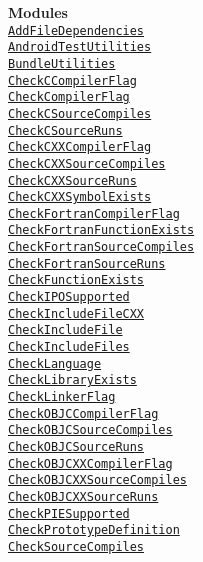 \documentclass{article}
\newcommand{\cmakemodule}[1]{{\href{https://cmake.org/cmake/help/v3.20/module/#1.html}{{\lstinline{#1}}}}}
\begin{document}
\pagebreak

\begin{minipage}[t]{0.18\linewidth}
\textbf{Modules}\\
\cmakemodule{AddFileDependencies}\\
\cmakemodule{AndroidTestUtilities}\\
\cmakemodule{BundleUtilities}\\
\cmakemodule{CheckCCompilerFlag}\\
\cmakemodule{CheckCompilerFlag}\\
\cmakemodule{CheckCSourceCompiles}\\
\cmakemodule{CheckCSourceRuns}\\
\cmakemodule{CheckCXXCompilerFlag}\\
\cmakemodule{CheckCXXSourceCompiles}\\
\cmakemodule{CheckCXXSourceRuns}\\
\cmakemodule{CheckCXXSymbolExists}\\
\cmakemodule{CheckFortranCompilerFlag}\\
\cmakemodule{CheckFortranFunctionExists}\\
\cmakemodule{CheckFortranSourceCompiles}\\
\cmakemodule{CheckFortranSourceRuns}\\
\cmakemodule{CheckFunctionExists}\\
\cmakemodule{CheckIPOSupported}\\
\cmakemodule{CheckIncludeFileCXX}\\
\cmakemodule{CheckIncludeFile}\\
\cmakemodule{CheckIncludeFiles}\\
\cmakemodule{CheckLanguage}\\
\cmakemodule{CheckLibraryExists}\\
\cmakemodule{CheckLinkerFlag}\\
\cmakemodule{CheckOBJCCompilerFlag}\\
\cmakemodule{CheckOBJCSourceCompiles}\\
\cmakemodule{CheckOBJCSourceRuns}\\
\cmakemodule{CheckOBJCXXCompilerFlag}\\
\cmakemodule{CheckOBJCXXSourceCompiles}\\
\cmakemodule{CheckOBJCXXSourceRuns}\\
\cmakemodule{CheckPIESupported}\\
\cmakemodule{CheckPrototypeDefinition}\\
\cmakemodule{CheckSourceCompiles}\\

\end{minipage}
\end{document}
